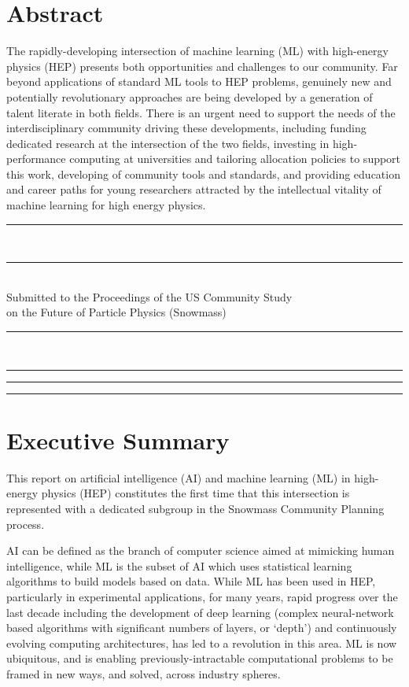 \documentclass[submission,Phys]{SciPost}
\newcommand\snowmass{\begin{center}\rule[-0.2in]{\hsize}{0.01in}\\\rule{\hsize}{0.01in}\\
\vskip 0.1in Submitted to the  Proceedings of the US Community Study\\ 
on the Future of Particle Physics (Snowmass)
\rule{\hsize}{0.01in}\\\rule[+0.2in]{\hsize}{0.01in} \end{center}}
\begin{document}
\section*{Abstract}
The rapidly-developing intersection of machine learning (ML) with high-energy physics (HEP) presents both opportunities and challenges to our community. Far beyond applications of standard ML tools to HEP problems, genuinely new and potentially revolutionary approaches are being developed by a generation of talent literate in both fields. There is an urgent need to support the needs of the interdisciplinary community driving these developments, including funding dedicated research at the intersection of the two fields, investing in high-performance computing at universities and tailoring allocation policies to support this work,  developing of community tools and standards, and providing education and  career paths for young researchers attracted by the intellectual vitality of machine learning for high energy physics.
\bigskip\bigskip\bigskip

\snowmass


\clearpage 

\vspace{10pt}
\noindent\rule{\textwidth}{1pt}
\tableofcontents\thispagestyle{fancy}
\noindent\rule{\textwidth}{1pt}
\vspace{10pt}

\clearpage

\section*{Executive Summary}

This report on artificial intelligence (AI) and machine learning (ML) in high-energy physics (HEP) constitutes the first time that this intersection is represented with a dedicated subgroup in the Snowmass Community Planning process. 

AI can be defined as the branch of computer science aimed at mimicking human intelligence, while ML is the subset of AI which uses statistical learning algorithms to build models based on data. While ML has been used in HEP, particularly in experimental applications, for many years, rapid progress over the last decade including the development of deep learning (complex neural-network based algorithms with significant numbers of layers, or `depth') and continuously evolving computing architectures, has led to a revolution in this area. ML is now ubiquitous, and is enabling previously-intractable computational problems to be framed in new ways, and solved, across industry spheres.
\end{document}
